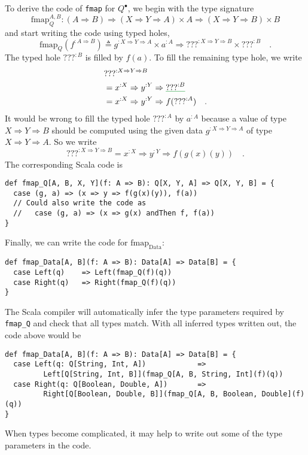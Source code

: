 To derive the code of \lstinline!fmap! for $Q^{\bullet}$, we begin
with the type signature
\[
\text{fmap}_{Q}^{A,B}:\left(A\Rightarrow B\right)\Rightarrow\left(X\Rightarrow Y\Rightarrow A\right)\times A\Rightarrow\left(X\Rightarrow Y\Rightarrow B\right)\times B
\]
and start writing the code using typed holes,
\[
\text{fmap}_{Q}(f^{:A\Rightarrow B})\triangleq g^{:X\Rightarrow Y\Rightarrow A}\times a^{:A}\Rightarrow\text{???}^{:X\Rightarrow Y\Rightarrow B}\times\text{???}^{:B}\quad.
\]
The typed hole $\text{???}^{:B}$ is filled by $f(a)$. To fill the
remaining type hole, we write
\begin{align*}
 & \text{???}^{:X\Rightarrow Y\Rightarrow B}\\
 & =x^{:X}\Rightarrow y^{:Y}\Rightarrow\gunderline{\text{???}^{:B}}\\
 & =x^{:X}\Rightarrow y^{:Y}\Rightarrow f(\text{???}^{:A})\quad.
\end{align*}
It would be wrong to fill the typed hole $\text{???}^{:A}$ by $a^{:A}$
because a value of type $X\Rightarrow Y\Rightarrow B$ should be computed
using the given data $g^{:X\Rightarrow Y\Rightarrow A}$ of type $X\Rightarrow Y\Rightarrow A$.
So we write
\[
\text{???}^{:X\Rightarrow Y\Rightarrow B}=x^{:X}\Rightarrow y^{:Y}\Rightarrow f(g(x)(y))\quad.
\]
The corresponding Scala code is
\begin{lstlisting}
def fmap_Q[A, B, X, Y](f: A => B): Q[X, Y, A] => Q[X, Y, B] = {
  case (g, a) => (x => y => f(g(x)(y)), f(a))
  // Could also write the code as
  //   case (g, a) => (x => g(x) andThen f, f(a))
}
\end{lstlisting}
Finally, we can write the code for $\text{fmap}_{\text{Data}}$:
\begin{lstlisting}
def fmap_Data[A, B](f: A => B): Data[A] => Data[B] = {
  case Left(q)    => Left(fmap_Q(f)(q))
  case Right(q)   => Right(fmap_Q(f)(q))
}
\end{lstlisting}
The Scala compiler will automatically infer the type parameters required
by \lstinline!fmap_Q! and check that all types match. With all inferred
types written out, the code above would be
\begin{lstlisting}
def fmap_Data[A, B](f: A => B): Data[A] => Data[B] = {
  case Left(q: Q[String, Int, A])            =>
         Left[Q[String, Int, B]](fmap_Q[A, B, String, Int](f)(q))
  case Right(q: Q[Boolean, Double, A])       =>
         Right[Q[Boolean, Double, B]](fmap_Q[A, B, Boolean, Double](f)(q))
}
\end{lstlisting}
When types become complicated, it may help to write out some of the
type parameters in the code.

